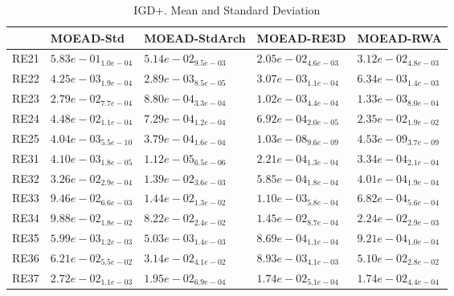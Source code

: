 \documentclass{article}
\begin{document}
\begin{table}
\caption{IGD+. Mean and Standard Deviation}
\label{table: IGD+}
\centering
\begin{scriptsize}
\begin{tabular}{lllll}
\hline & MOEAD-Std & MOEAD-StdArch & MOEAD-RE3D &  MOEAD-RWA\\
\hline 
RE21 & $  5.83e-01_{ 1.0e-04}$ & $  5.14e-02_{ 9.5e-03}$ & \cellcolor{gray95}$  2.05e-02_{ 4.6e-03}$ & \cellcolor{gray25}$  3.12e-02_{ 4.8e-03}$ \\
RE22 & $  4.25e-03_{ 1.9e-04}$ & \cellcolor{gray95}$  2.89e-03_{ 8.5e-05}$ & \cellcolor{gray25}$  3.07e-03_{ 1.1e-04}$ & $  6.34e-03_{ 1.4e-03}$ \\
RE23 & $  2.79e-02_{ 7.7e-04}$ & \cellcolor{gray95}$  8.80e-04_{ 3.3e-04}$ & \cellcolor{gray25}$  1.02e-03_{ 4.4e-04}$ & $  1.33e-03_{ 8.0e-04}$ \\
RE24 & $  4.48e-02_{ 1.1e-04}$ & \cellcolor{gray25}$  7.29e-04_{ 1.2e-04}$ & \cellcolor{gray95}$  6.92e-04_{ 2.0e-05}$ & $  2.35e-02_{ 1.9e-02}$ \\
RE25 & $  4.04e-03_{ 5.5e-10}$ & $  3.79e-04_{ 1.6e-04}$ & \cellcolor{gray25}$  1.03e-08_{ 9.6e-09}$ & \cellcolor{gray95}$  4.53e-09_{ 3.7e-09}$ \\
RE31 & $  4.10e-03_{ 1.8e-05}$ & \cellcolor{gray95}$  1.12e-05_{ 6.5e-06}$ & \cellcolor{gray25}$  2.21e-04_{ 1.3e-04}$ & $  3.34e-04_{ 2.1e-04}$ \\
RE32 & $  3.26e-02_{ 2.9e-04}$ & $  1.39e-02_{ 3.6e-03}$ & \cellcolor{gray25}$  5.85e-04_{ 1.8e-04}$ & \cellcolor{gray95}$  4.01e-04_{ 1.9e-04}$ \\
RE33 & $  9.46e-02_{ 6.6e-03}$ & $  1.44e-02_{ 1.3e-02}$ & \cellcolor{gray25}$  1.10e-03_{ 5.8e-04}$ & \cellcolor{gray95}$  6.82e-04_{ 5.6e-04}$ \\
RE34 & $  9.88e-02_{ 1.8e-02}$ & $  8.22e-02_{ 2.4e-02}$ & \cellcolor{gray95}$  1.45e-02_{ 8.7e-04}$ & \cellcolor{gray25}$  2.24e-02_{ 2.9e-03}$ \\
RE35 & $  5.99e-03_{ 1.2e-03}$ & $  5.03e-03_{ 1.4e-03}$ & \cellcolor{gray95}$  8.69e-04_{ 1.1e-04}$ & \cellcolor{gray25}$  9.21e-04_{ 1.0e-04}$ \\
RE36 & $  6.21e-02_{ 5.5e-02}$ & \cellcolor{gray25}$  3.14e-02_{ 4.1e-02}$ & \cellcolor{gray95}$  8.93e-03_{ 4.1e-03}$ & $  5.10e-02_{ 2.8e-02}$ \\
RE37 & $  2.72e-02_{ 1.1e-03}$ & $  1.95e-02_{ 6.9e-04}$ & \cellcolor{gray25}$  1.74e-02_{ 5.1e-04}$ & \cellcolor{gray95}$  1.74e-02_{ 4.4e-04}$ \\

\end{tabular}
\end{scriptsize}
\end{table}
\end{document}
